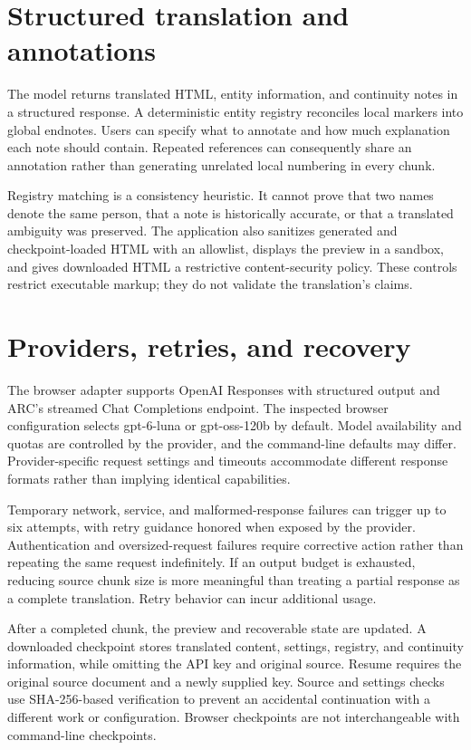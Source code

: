 \documentclass[manuscript,screen,nonacm]{acmart}
\begin{document}
\section{Structured translation and annotations}

The model returns translated HTML, entity information, and continuity notes in a structured response. A deterministic entity registry reconciles local markers into global endnotes. Users can specify what to annotate and how much explanation each note should contain. Repeated references can consequently share an annotation rather than generating unrelated local numbering in every chunk.

Registry matching is a consistency heuristic. It cannot prove that two names denote the same person, that a note is historically accurate, or that a translated ambiguity was preserved. The application also sanitizes generated and checkpoint-loaded HTML with an allowlist, displays the preview in a sandbox, and gives downloaded HTML a restrictive content-security policy. These controls restrict executable markup; they do not validate the translation's claims.

\section{Providers, retries, and recovery}

The browser adapter supports OpenAI Responses with structured output and ARC's streamed Chat Completions endpoint. The inspected browser configuration selects gpt-6-luna or gpt-oss-120b by default. Model availability and quotas are controlled by the provider, and the command-line defaults may differ. Provider-specific request settings and timeouts accommodate different response formats rather than implying identical capabilities.

Temporary network, service, and malformed-response failures can trigger up to six attempts, with retry guidance honored when exposed by the provider. Authentication and oversized-request failures require corrective action rather than repeating the same request indefinitely. If an output budget is exhausted, reducing source chunk size is more meaningful than treating a partial response as a complete translation. Retry behavior can incur additional usage.



After a completed chunk, the preview and recoverable state are updated. A downloaded checkpoint stores translated content, settings, registry, and continuity information, while omitting the API key and original source. Resume requires the original source document and a newly supplied key. Source and settings checks use SHA-256-based verification to prevent an accidental continuation with a different work or configuration. Browser checkpoints are not interchangeable with command-line checkpoints.
\end{document}
